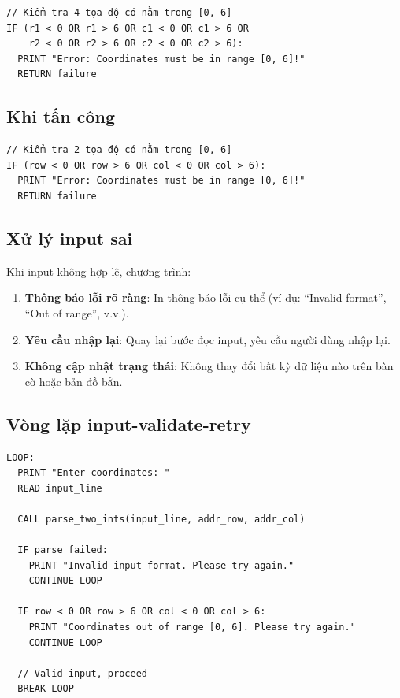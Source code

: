 \begin{verbatim}
// Kiểm tra 4 tọa độ có nằm trong [0, 6]
IF (r1 < 0 OR r1 > 6 OR c1 < 0 OR c1 > 6 OR
    r2 < 0 OR r2 > 6 OR c2 < 0 OR c2 > 6):
  PRINT "Error: Coordinates must be in range [0, 6]!"
  RETURN failure
\end{verbatim}

\subsection{Khi tấn công}

\begin{verbatim}
// Kiểm tra 2 tọa độ có nằm trong [0, 6]
IF (row < 0 OR row > 6 OR col < 0 OR col > 6):
  PRINT "Error: Coordinates must be in range [0, 6]!"
  RETURN failure
\end{verbatim}

\subsection{Xử lý input sai}

Khi input không hợp lệ, chương trình:

\begin{enumerate}
    \item \textbf{Thông báo lỗi rõ ràng}: In thông báo lỗi cụ thể (ví dụ: ``Invalid format'', ``Out of range'', v.v.).
    
    \item \textbf{Yêu cầu nhập lại}: Quay lại bước đọc input, yêu cầu người dùng nhập lại.
    
    \item \textbf{Không cập nhật trạng thái}: Không thay đổi bất kỳ dữ liệu nào trên bàn cờ hoặc bản đồ bắn.
\end{enumerate}

\subsection{Vòng lặp input-validate-retry}

\begin{verbatim}
LOOP:
  PRINT "Enter coordinates: "
  READ input_line
  
  CALL parse_two_ints(input_line, addr_row, addr_col)
  
  IF parse failed:
    PRINT "Invalid input format. Please try again."
    CONTINUE LOOP
  
  IF row < 0 OR row > 6 OR col < 0 OR col > 6:
    PRINT "Coordinates out of range [0, 6]. Please try again."
    CONTINUE LOOP
  
  // Valid input, proceed
  BREAK LOOP
\end{verbatim}

